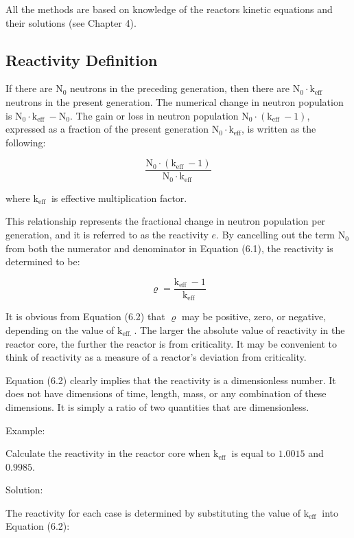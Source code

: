 \documentclass[10pt]{article}
\begin{document}
All the methods are based on knowledge of the reactors kinetic equations and their solutions (see Chapter 4).

\subsection{Reactivity Definition}
If there are $\mathrm{N}_{0}$ neutrons in the preceding generation, then there are $\mathrm{N}_{0} \cdot \mathrm{k}_{\text {eff }}$ neutrons in the present generation. The numerical change in neutron population is $\mathrm{N}_{0} \cdot \mathrm{k}_{\text {eff }}-\mathrm{N}_{0}$. The gain or loss in neutron population $\mathrm{N}_{0} \cdot\left(\mathrm{k}_{\text {eff }}-1\right)$, expressed as a fraction of the present generation $\mathrm{N}_{0} \cdot \mathrm{k}_{\mathrm{eff}}$, is written as the following:

$$
\frac{\mathrm{N}_{0} \cdot\left(\mathrm{k}_{\text {eff }}-1\right)}{\mathrm{N}_{0} \cdot \mathrm{k}_{\text {eff }}}
$$

where $\mathrm{k}_{\text {eff }}$ is effective multiplication factor.

This relationship represents the fractional change in neutron population per generation, and it is referred to as the reactivity $e$. By cancelling out the term $\mathrm{N}_{0}$ from both the numerator and denominator in Equation (6.1), the reactivity is determined to be:

$$
\varrho=\frac{\mathrm{k}_{\text {eff }}-1}{\mathrm{k}_{\text {eff }}}
$$

It is obvious from Equation (6.2) that $\varrho$ may be positive, zero, or negative, depending on the value of $\mathrm{k}_{\text {eff. }}$. The larger the absolute value of reactivity in the reactor core, the further the reactor is from criticality. It may be convenient to think of reactivity as a measure of a reactor's deviation from criticality.

Equation (6.2) clearly implies that the reactivity is a dimensionless number. It does not have dimensions of time, length, mass, or any combination of these dimensions. It is simply a ratio of two quantities that are dimensionless.

Example:

Calculate the reactivity in the reactor core when $\mathrm{k}_{\text {eff }}$ is equal to $1.0015$ and $0.9985$.

Solution:

The reactivity for each case is determined by substituting the value of $\mathrm{k}_{\text {eff }}$ into Equation (6.2):
\end{document}
